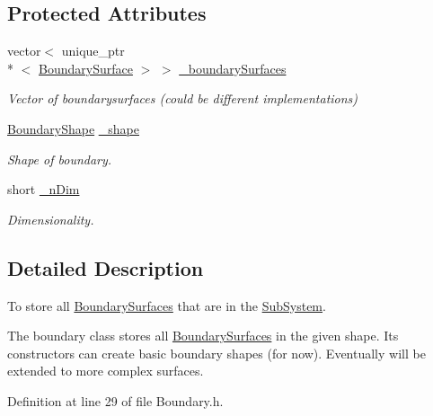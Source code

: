 \subsection*{Protected Attributes}
\begin{DoxyCompactItemize}
\item 
vector$<$ unique\+\_\+ptr\\*
$<$ \hyperlink{classBoundarySurface}{Boundary\+Surface} $>$ $>$ \hyperlink{classBoundary_abbac1843206a158e7d0a6e741cdc00c1}{\+\_\+boundary\+Surfaces}
\begin{DoxyCompactList}\small\item\em Vector of boundarysurfaces (could be different implementations) \end{DoxyCompactList}\item 
\hyperlink{Boundary_8h_a0099b369f2bc119c1b54728734b41132}{Boundary\+Shape} \hyperlink{classBoundary_a04c10c9a7aea1924d779d392e29f94ff}{\+\_\+shape}
\begin{DoxyCompactList}\small\item\em Shape of boundary. \end{DoxyCompactList}\item 
short \hyperlink{classBoundary_a96f2294e0c822ab216fe5ab7e17258c7}{\+\_\+n\+Dim}
\begin{DoxyCompactList}\small\item\em Dimensionality. \end{DoxyCompactList}\end{DoxyCompactItemize}


\subsection{Detailed Description}
To store all \hyperlink{classBoundarySurface}{Boundary\+Surfaces} that are in the \hyperlink{classSubSystem}{Sub\+System}. 

The boundary class stores all \hyperlink{classBoundarySurface}{Boundary\+Surfaces} in the given shape. Its constructors can create basic boundary shapes (for now). Eventually will be extended to more complex surfaces. 

Definition at line 29 of file Boundary.\+h.



